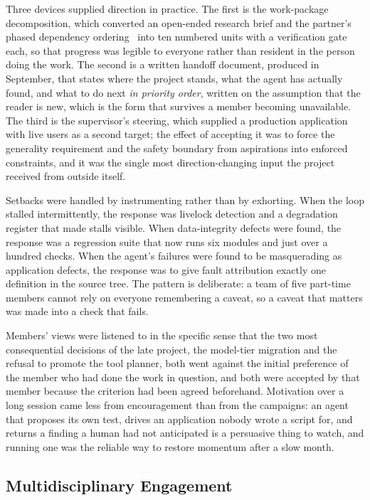 Three devices supplied direction in practice. The first is the work-package
decomposition, which converted an open-ended research brief and the partner's
phased dependency ordering~\cite{etatr} into ten numbered units with a
verification gate each, so that progress was legible to everyone rather than
resident in the person doing the work. The second is a written handoff
document, produced in September, that states where the project stands, what the
agent has actually found, and what to do next \emph{in priority order},
written on the assumption that the reader is new, which is the form that
survives a member becoming unavailable. The third is the supervisor's steering,
which supplied a production application with live users as a second target; the
effect of accepting it was to force the generality requirement and the safety
boundary from aspirations into enforced constraints, and it was the single
most direction-changing input the project received from outside itself.

Setbacks were handled by instrumenting rather than by exhorting. When the loop
stalled intermittently, the response was livelock detection and a degradation
register that made stalls visible. When data-integrity defects were found, the
response was a regression suite that now runs six modules and just over a
hundred checks. When the agent's failures were found to be masquerading as
application defects, the response was to give fault attribution exactly one
definition in the source tree. The pattern is deliberate: a team of five
part-time members cannot rely on everyone remembering a caveat, so a caveat that
matters was made into a check that fails.

Members' views were listened to in the specific sense that the two most
consequential decisions of the late project, the model-tier migration and the
refusal to promote the tool planner, both went against the initial preference of
the member who had done the work in question, and both were accepted by that
member because the criterion had been agreed beforehand. Motivation over a long
session came less from encouragement than from the campaigns: an agent that
proposes its own test, drives an application nobody wrote a script for, and
returns a finding a human had not anticipated is a persuasive thing to watch,
and running one was the reliable way to restore momentum after a slow month.

\subsection{Multidisciplinary Engagement}
\label{sec:multidisciplinary}

